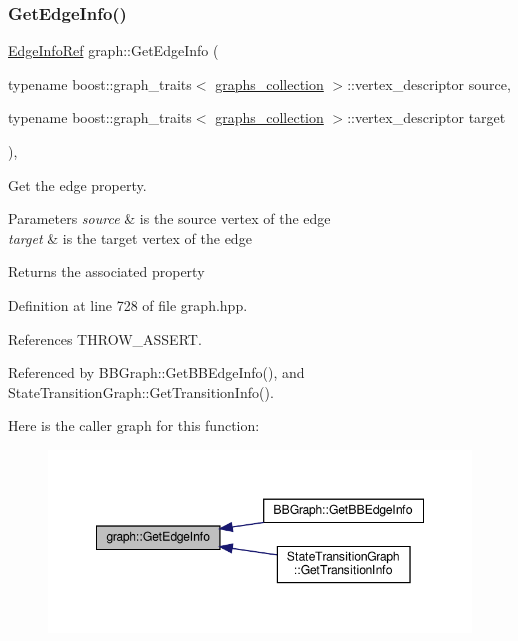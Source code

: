 \subsubsection{\texorpdfstring{Get\+Edge\+Info()}{GetEdgeInfo()}\hspace{0.1cm}{\footnotesize\ttfamily [1/2]}}
{\footnotesize\ttfamily \hyperlink{edge__info_8hpp_a65ddc964b1738667fc720f0de33aeef9}{Edge\+Info\+Ref} graph\+::\+Get\+Edge\+Info (\begin{DoxyParamCaption}\item[{typename boost\+::graph\+\_\+traits$<$ \hyperlink{structgraphs__collection}{graphs\+\_\+collection} $>$\+::vertex\+\_\+descriptor}]{source,  }\item[{typename boost\+::graph\+\_\+traits$<$ \hyperlink{structgraphs__collection}{graphs\+\_\+collection} $>$\+::vertex\+\_\+descriptor}]{target }\end{DoxyParamCaption})\hspace{0.3cm}{\ttfamily [inline]}, {\ttfamily [protected]}}



Get the edge property. 


\begin{DoxyParams}{Parameters}
{\em source} & is the source vertex of the edge \\
\hline
{\em target} & is the target vertex of the edge \\
\hline
\end{DoxyParams}
\begin{DoxyReturn}{Returns}
the associated property 
\end{DoxyReturn}


Definition at line 728 of file graph.\+hpp.



References T\+H\+R\+O\+W\+\_\+\+A\+S\+S\+E\+RT.



Referenced by B\+B\+Graph\+::\+Get\+B\+B\+Edge\+Info(), and State\+Transition\+Graph\+::\+Get\+Transition\+Info().

Here is the caller graph for this function\+:
\nopagebreak
\begin{figure}[H]
\begin{center}
\leavevmode
\includegraphics[width=348pt]{d5/d15/structgraph_a27f542404060a7ffa5ece86d7979a6c3_icgraph}
\end{center}
\end{figure}
\mbox{\label{structgraph_ae7792ce7a4df2195b3ee3cb17296df03}} 
